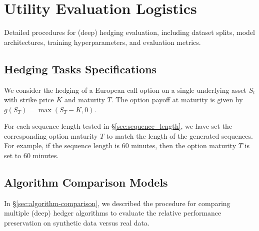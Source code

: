 \documentclass[sigconf]{acmart}
\begin{document}
\appendix

\section{Utility Evaluation Logistics}
  Detailed procedures for (deep) hedging evaluation, including
  dataset splits, model architectures, training hyperparameters,
  and evaluation metrics.

  \subsection{Hedging Tasks Specifications}
    We consider the hedging of a European call option on a single
    underlying asset \( S_t \) with strike price \( K \) and
    maturity \( T \). The option payoff at maturity is given by
    \( g(S_T) = \max(S_T - K, 0) \).

    For each sequence length tested in §\ref{sec:sequence_length},
    we have set the corresponding option maturity \( T \) to match
    the length of the generated sequences. For example, if the
    sequence length is 60 minutes, then the option maturity \( T \)
    is set to 60 minutes.

  \subsection{Algorithm Comparison Models}\label{appendix:deep-hedger-algorithms}
    In §\ref{sec:algorithm-comparison}, we described the procedure
    for comparing multiple (deep) hedger algorithms to evaluate the
    relative performance preservation on synthetic data versus real
    data.
  
\end{document}
